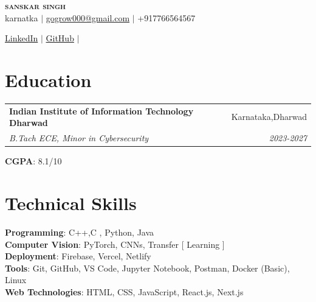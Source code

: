 \documentclass[a4paper,10pt]{article}
\makeatletter
\newcommand{\resumeSubheading}[4]{
  \vspace{-1pt}\item
    \begin{tabular*}{0.97\textwidth}[t]{l@{\extracolsep{\fill}}r}
      \textbf{#1} & #2 \\
      \textit{\small#3} & \textit{\small #4} \\
    \end{tabular*}\vspace{-5pt}
}
\makeatother
\begin{document}
\begin{center}
    \textbf{\Huge \scshape \color{resumeBlue} sanskar singh} \\ \vspace{3pt}
    \small
    \faMapMarker* karnatka \hspace{5pt} $|$ \hspace{5pt}
    \faEnvelope \hspace{2pt} \href{mailto:gogrow000@gmail.com}{gogrow000@gmail.com} \hspace{5pt} $|$ \hspace{5pt}
    \faPhone \hspace{2pt} +917766564567 \\ \vspace{3pt}

    \href{https://www.linkedin.com/in/iamsanskar-kumar-2a903a31a/}{\color{resumeBlue}\faLinkedin \hspace{2pt} LinkedIn} \hspace{5pt} $|$ \hspace{5pt}
    \href{https://github.com/Sanskarsanshu}{\color{resumeBlue}\faGithub \hspace{2pt} GitHub} \hspace{5pt} $|$ \hspace{5pt}
    
\end{center}

\section{Education}
\begin{itemize}[leftmargin=0.15in, label={}]
\resumeSubheading
{Indian Institute of Information Technology Dharwad}{Karnataka,Dharwad}
{B.Tach ECE, Minor in Cybersecurity}{2023-2027}
\small{\item{\textbf{CGPA}: 8.1/10 }}
\end{itemize}

\section{Technical Skills}
\begin{itemize}[leftmargin=0.15in, label={}]
\small{\item{
\textbf{Programming}: C++,C , Python, Java \\
\textbf{Computer Vision}: PyTorch, CNNs, Transfer [ Learning ] \\

\textbf{Deployment}: Firebase, Vercel, Netlify \\
\textbf{Tools}: Git, GitHub, VS Code, Jupyter Notebook, Postman, Docker (Basic), Linux \\
\textbf{Web Technologies}: HTML, CSS, JavaScript, React.js, Next.js
}}
\end{itemize}
\end{document}

